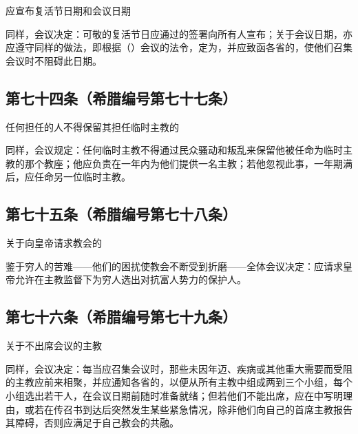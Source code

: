 应宣布复活节日期和会议日期\par

同样，会议决定：可敬的复活节日应通过的签署向所有人宣布；关于会议日期，亦应遵守同样的做法，即根据（）会议的法令，定为，并应致函各省的，使他们召集会议时不阻碍此日期。\par


\subsection{第七十四条（希腊编号第七十七条）}

任何担任的人不得保留其担任临时主教的\par

同样，会议规定：任何临时主教不得通过民众骚动和叛乱来保留他被任命为临时主教的那个教座；他应负责在一年内为他们提供一名主教；若他忽视此事，一年期满后，应任命另一位临时主教。\par


\subsection{第七十五条（希腊编号第七十八条）}

关于向皇帝请求教会的\par

鉴于穷人的苦难——他们的困扰使教会不断受到折磨——全体会议决定：应请求皇帝允许在主教监督下为穷人选出对抗富人势力的保护人。\par


\subsection{第七十六条（希腊编号第七十九条）}

关于不出席会议的主教\par

同样，会议决定：每当应召集会议时，那些未因年迈、疾病或其他重大需要而受阻的主教应前来相聚，并应通知各省的，以便从所有主教中组成两到三个小组，每个小组选出若干人，在会议日期前随时准备就绪；但若他们不能出席，应在中写明理由，或若在传召书到达后突然发生某些紧急情况，除非他们向自己的首席主教报告其障碍，否则应满足于自己教会的共融。\par

